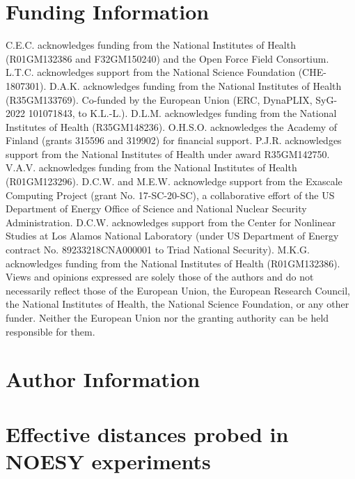 \documentclass[9pt,review,pubversion]{livecoms}
\begin{document}
\section*{Funding Information}

C.E.C. acknowledges funding from the National Institutes of Health (R01GM132386 and F32GM150240) and the
Open Force Field Consortium.
L.T.C. acknowledges support from the National Science Foundation (CHE-1807301).
D.A.K. acknowledges funding from the National Institutes of Health (R35GM133769).
Co-funded by the European Union (ERC, DynaPLIX, SyG-2022 101071843, to K.L.-L.).
D.L.M. acknowledges funding from the National Institutes of Health (R35GM148236).
O.H.S.O. acknowledges the Academy of Finland (grants 315596 and 319902) for financial
support.
P.J.R. acknowledges support from the National Institutes of Health under award R35GM142750.
V.A.V. acknowledges funding from the National Institutes of Health (R01GM123296).
D.C.W. and M.E.W. acknowledge support from the Exascale Computing Project (grant No.
17-SC-20-SC), a collaborative effort of the US Department of Energy Office of Science and
National Nuclear Security Administration.
D.C.W. acknowledges support from the Center for Nonlinear Studies at Los Alamos National
Laboratory (under US Department of Energy contract No. 89233218CNA000001 to Triad
National Security).
M.K.G. acknowledges funding from the National Institutes of Health (R01GM132386).
Views and opinions expressed are solely those of the authors and do not necessarily reflect those of the European Union, the European Research Council, the National Institutes of Health, the National Science Foundation, or any other funder.
Neither the European Union nor the granting authority can be held responsible for them.

\section*{Author Information}
\makeorcid




\appendix
\section{Effective distances probed in NOESY experiments}
\label{app:noesy_distances}
\end{document}
